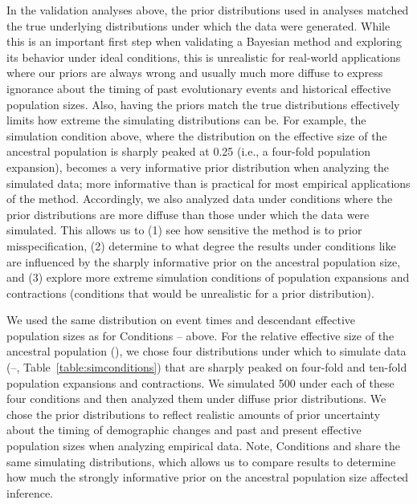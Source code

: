In the validation analyses above, the prior distributions used in analyses
matched the true underlying distributions under which the data were generated.
While this is an important first step when validating a Bayesian method
and exploring its behavior under ideal conditions,
this is unrealistic for real-world applications
where our priors are always wrong and usually much more diffuse to express
ignorance about the timing of past evolutionary events and historical effective
population sizes.
Also, having the priors match the true distributions effectively
limits how extreme the simulating distributions can be.
For example, the simulation condition \vsimfourinc above, where the
distribution on the effective size of the ancestral population is sharply
peaked at 0.25 (i.e., a four-fold population expansion), becomes a very
informative prior distribution when analyzing the simulated data;
more informative than is practical for most empirical applications of the
method.
Accordingly, we also analyzed data under conditions where the prior
distributions are more diffuse than those under which the data were simulated.
This allows us to
(1) see how sensitive the method is to prior misspecification,
(2) determine to what degree the results under conditions like \vsimfourinc are
influenced by the sharply informative prior on the ancestral population size,
and
(3) explore more extreme simulation conditions of population expansions and
contractions (conditions that would be unrealistic for a prior distribution).

We used the same distribution on event times and descendant effective
population sizes as for Conditions --
above.
For the relative effective size of the ancestral population
(\rootrelativepopsize), we chose four distributions under which to simulate
data
(--, Table~\ref{table:simconditions})
that are sharply peaked on four-fold and ten-fold population
expansions and contractions.
We simulated 500 \datasets under each of these four conditions and then
analyzed them under diffuse prior distributions.
We chose the prior distributions to reflect realistic amounts of prior
uncertainty about the timing of demographic changes and past and present
effective population sizes when analyzing empirical data.
Note, Conditions \vsimfourinc and \msimfourinc share the same simulating
distributions, which allows us to compare results to determine how much the
strongly informative prior on the ancestral population size affected inference.


